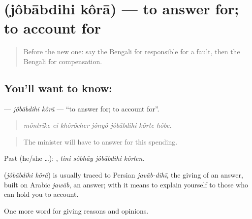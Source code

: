 \section[\texorpdfstring{\bn{জবাবদিহি} \bn{করা} (jôbābdihi kôrā)}{জবাবদিহি করা (jôbābdihi kôrā)}]{  (jôbābdihi kôrā) — to answer for; to account for}

\label{lesson:BN-C343-jobabdihi-kora}



\begin{quote}
Before the new one: say the Bengali for responsible for a fault, then the Bengali for compensation.
\end{quote}

\subsection*{You'll want to know:  }
\textbf{ } — \emph{jôbābdihi kôrā} — \textquotedblleft{}to answer for; to account for\textquotedblright{}.

\begin{quote}
      
\end{quote}

\begin{quote}
\emph{môntrīke ei khôrôcher jônyô jôbābdihi kôrte hôbe.}
\end{quote}

\begin{quote}
The minister will have to answer for this spending.
\end{quote}

Past (he/she …):    , \emph{tini sôbhāy jôbābdihi kôrlen}.

\begin{cousinweb}
\textbf{ } (\emph{jôbābdihi kôrā}) is usually traced to Persian \emph{javāb-dihī}, the giving of an answer, built on Arabic \emph{jawāb}, an answer; with  it means to explain yourself to those who can hold you to account.
\end{cousinweb}

\begin{grammarlens}[title={What you've built}]
One more word for giving reasons and opinions.
\end{grammarlens}

